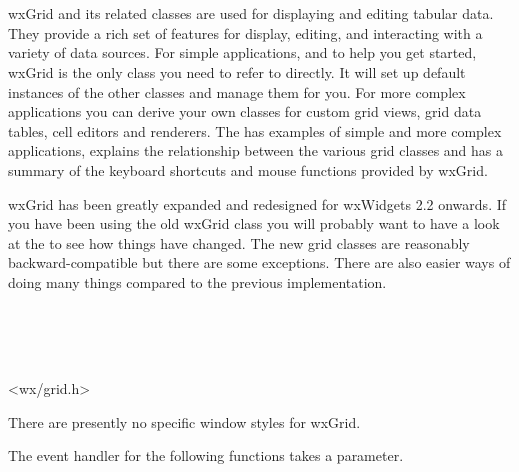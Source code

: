 \section{}\label{wxgrid}

wxGrid and its related classes are used for displaying and editing tabular
data. They provide a rich set of features for display, editing, and
interacting with a variety of data sources. For simple applications, and to
help you get started, wxGrid is the only class you need to refer to
directly. It will set up default instances of the other classes and manage
them for you. For more complex applications you can derive your own
classes for custom grid views, grid data tables, cell editors and
renderers. The  has
examples of simple and more complex applications, explains the
relationship between the various grid classes and has a summary of the
keyboard shortcuts and mouse functions provided by wxGrid.

wxGrid has been greatly expanded and redesigned for wxWidgets 2.2
onwards. If you have been using the old wxGrid class you will probably
want to have a look at the  to see
how things have changed. The new grid classes are reasonably backward-compatible
but there are some exceptions. There are also easier ways of doing many things compared to
the previous implementation. 


\\
\\
\\


<wx/grid.h>


There are presently no specific window styles for wxGrid.




The event handler for the following functions takes a 
  parameter.

\twocolwidtha{7cm}
\begin{twocollist}\itemsep=0pt
\end{twocollist}%


